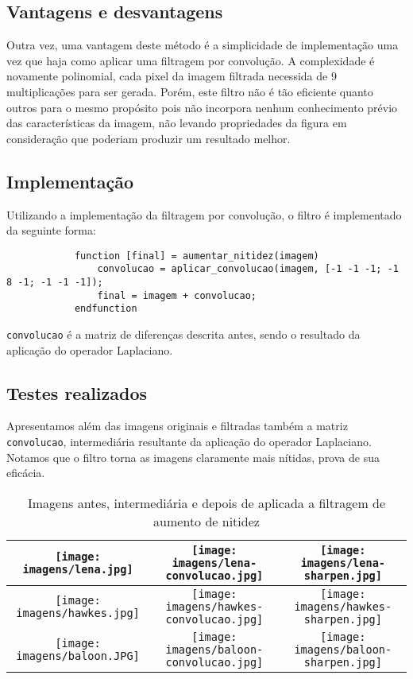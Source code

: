 \documentclass[brazil,times]{abnt}
\begin{document}
		\subsection{Vantagens e desvantagens}
			Outra vez, uma vantagem deste método é a simplicidade de implementação uma vez que haja como aplicar uma filtragem por convolução. A complexidade é novamente polinomial, cada pixel da imagem filtrada necessida de 9 multiplicações para ser gerada. Porém, este filtro não é tão eficiente quanto outros para o mesmo propósito pois não incorpora nenhum conhecimento prévio das características da imagem, não levando propriedades da figura em consideração que poderiam produzir um resultado melhor.
			
		\subsection{Implementação}
			Utilizando a implementação da filtragem por convolução, o filtro é implementado da seguinte forma:
			
			\begin{lstlisting}
			function [final] = aumentar_nitidez(imagem)
				convolucao = aplicar_convolucao(imagem, [-1 -1 -1; -1 8 -1; -1 -1 -1]);
			    final = imagem + convolucao;
			endfunction
			\end{lstlisting}
			
			\texttt{convolucao} é a matriz de diferenças descrita antes, sendo o resultado da aplicação do operador Laplaciano.
		
		\subsection{Testes realizados}
			Apresentamos além das imagens originais e filtradas também a matriz \texttt{convolucao}, intermediária resultante da aplicação do operador Laplaciano. Notamos que o filtro torna as imagens claramente mais nítidas, prova de sua eficácia.
			\begin{table}[ht]
			\caption{Imagens antes, intermediária e depois de aplicada a filtragem de aumento de nitidez}
			\centering
			\begin{tabular}{|c|c|c|}
			\hline
			\texttt{[image: imagens/lena.jpg]}&\texttt{[image: imagens/lena-convolucao.jpg]}&\texttt{[image: imagens/lena-sharpen.jpg]}\\
			\hline
			\texttt{[image: imagens/hawkes.jpg]}&\texttt{[image: imagens/hawkes-convolucao.jpg]}&\texttt{[image: imagens/hawkes-sharpen.jpg]}\\
			\hline
			\texttt{[image: imagens/baloon.JPG]}&\texttt{[image: imagens/baloon-convolucao.jpg]}&\texttt{[image: imagens/baloon-sharpen.jpg]}\\
			\hline
			\end{tabular}
			\label{tab:gt}
			\end{table}
\end{document}
